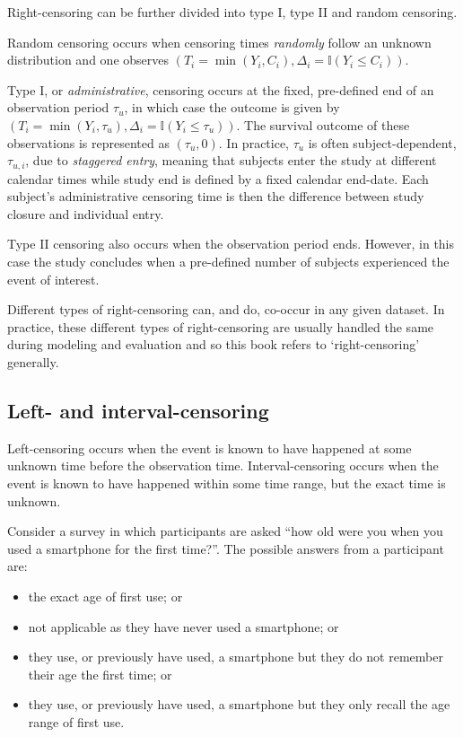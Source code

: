 \documentclass[
  letterpaper,
  krantz2]{style/krantz}
\providecommand{\tightlist}{%
  \setlength{\itemsep}{0pt}\setlength{\parskip}{0pt}}
\begin{document}
Right-censoring can be further divided into type
I, type II and random
censoring.

Random censoring occurs when censoring times \emph{randomly} follow an
unknown distribution and one observes
\((T_i=\min(Y_i,C_i), \Delta_i = \mathbb{I}(Y_i\leq C_i))\).

Type I, or \emph{administrative}, censoring occurs at the fixed,
pre-defined end of an observation period \(\tau_u\), in which case the
outcome is given by
\((T_i = \min(Y_i, \tau_u), \Delta_i = \mathbb{I}(Y_i \leq \tau_u))\).
The survival outcome of these observations is represented as
\((\tau_u, 0)\). In practice, \(\tau_u\) is often subject-dependent,
\(\tau_{u,i}\), due to \emph{staggered entry},
meaning that subjects enter the study at different calendar times while
study end is defined by a fixed calendar end-date. Each subject's
administrative censoring time is then the difference between study
closure and individual entry.

Type II censoring also occurs when the observation period ends. However,
in this case the study concludes when a pre-defined number of subjects
experienced the event of interest.

Different types of right-censoring can, and do, co-occur in any given
dataset. In practice, these different types of right-censoring are
usually handled the same during modeling and evaluation and so this book
refers to `right-censoring' generally.

\subsection{Left- and
interval-censoring}\label{sec-types-of-censoring-left-interval}

Left-censoring occurs when the event is known to
have happened at some unknown time before the observation time.
Interval-censoring occurs when the event is
known to have happened within some time range, but the exact time is
unknown.

Consider a survey in which participants are asked ``how old were you
when you used a smartphone for the first time?''. The possible answers
from a participant are:

\begin{itemize}
\tightlist
\item
  the exact age of first use; or
\item
  not applicable as they have never used a smartphone; or
\item
  they use, or previously have used, a smartphone but they do not
  remember their age the first time; or
\item
  they use, or previously have used, a smartphone but they only recall
  the age range of first use.
\end{itemize}
\end{document}
